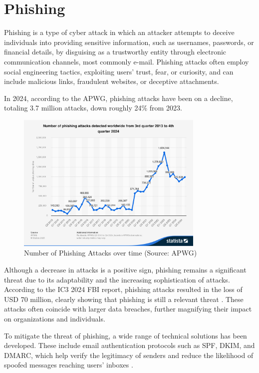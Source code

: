 \section{Phishing}

Phishing is a type of cyber attack in which an attacker attempts to deceive individuals into providing sensitive information, such as usernames, passwords, or financial details, by disguising as a trustworthy entity through electronic communication channels, most commonly e-mail. Phishing attacks often employ social engineering tactics, exploiting users’ trust, fear, or curiosity, and can include malicious links, fraudulent websites, or deceptive attachments.

In 2024, according to the \ac{APWG}, phishing attacks have been on a decline, totaling 3.7 million attacks, down roughly 24\% from 2023.

\begin{figure}[ht]
    \centering
    \includegraphics[width=0.8\textwidth]{figs/phishing_trends.png}
    \caption{Number of Phishing Attacks over time (Source: APWG)}
    \label{fig:phishing_trends}
\end{figure}

Although a decrease in attacks is a positive sign, phishing remains a significant threat due to its adaptability and the increasing sophistication of attacks. According to the \acs{IC3} 2024 \acs{FBI} report, phishing attacks resulted in the loss of USD 70 million, clearly showing that phishing is still a relevant threat \cite{IC32024}. These attacks often coincide with larger data breaches, further magnifying their impact on organizations and individuals.

To mitigate the threat of phishing, a wide range of technical solutions has been developed. 
These include email authentication protocols such as \ac{SPF}, \ac{DKIM}, and \ac{DMARC}, which help verify the legitimacy of senders and reduce the likelihood of spoofed messages reaching users’ inboxes \cite{DEROUET20165}.

